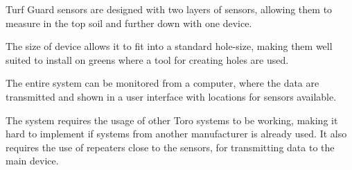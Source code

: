 Turf Guard\texttrademark{} sensors are designed with two layers of sensors, allowing them to measure in the top soil and further down with one device.

The size of device allows it to fit into a standard hole-size, making them well suited to install on greens where a tool for creating holes are used\cite{turfGuard2}.

The entire system can be monitored from a computer, where the data are transmitted and shown in a user interface with locations for sensors available\cite{turfGuard2}.

The system requires the usage of other Toro systems to be working, making it hard to implement if systems from another manufacturer is already used. It also requires the use of repeaters close to the sensors, for transmitting data to the main device\cite{turfGuard2}.
